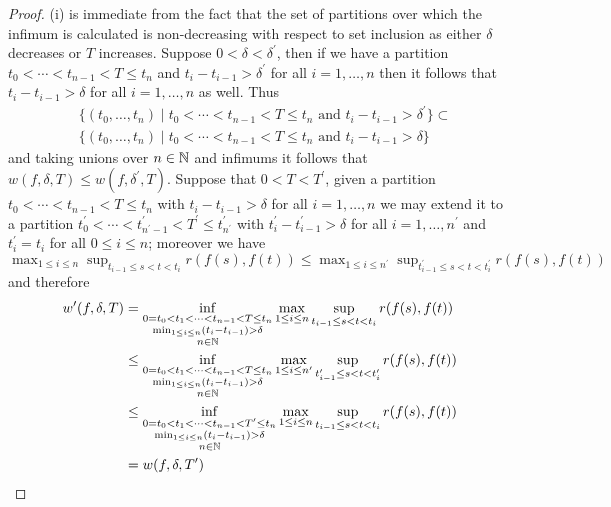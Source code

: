 \begin{proof}
(i) is immediate from the fact that the set of partitions over which the infimum is calculated is non-decreasing with respect to set inclusion as either $\delta$ decreases or $T$ increases.  Suppose $0 < \delta < \delta^\prime$, then if we have a partition $t_0 < \dotsb < t_{n-1} < T \leq t_n$ and $t_i - t_{i-1} > \delta^\prime$ for all $i=1, \dotsc, n$ then it follows that $t_i - t_{i-1} > \delta$ for all $i=1, \dotsc, n$ as well.  Thus 
\begin{align*}
&\lbrace (t_0, \dotsc, t_n) \mid t_0 < \dotsb < t_{n-1} < T \leq t_n \text{ and } t_i - t_{i-1} > \delta^\prime \rbrace \subset  \\
&\lbrace (t_0, \dotsc, t_n) \mid t_0 < \dotsb < t_{n-1} < T \leq t_n \text{ and } t_i - t_{i-1} > \delta \rbrace 
\end{align*}
and taking unions over $n \in \mathbb{N}$ and infimums it follows that $w(f,\delta, T) \leq w(f,\delta^\prime, T)$.  Suppose that $0 < T < T^\prime$, given a partition $t_0 < \dotsb < t_{n-1} < T \leq t_n$ with $t_i - t_{i-1} > \delta$ for all $i=1, \dotsc, n$ we may extend it to a partition $t^\prime_0 < \dotsb < t^\prime_{n^\prime-1} < T^\prime \leq t^\prime_{n^\prime}$ with $t^\prime_i - t^\prime_{i-1} > \delta$ for all $i=1, \dotsc, n^\prime$ and $t^\prime_i = t_i$ for all $0 \leq i \leq n$; moreover we have $\max_{1 \leq i \leq n} \sup_{t_{i-1} \leq s < t < t_i} r(f(s),f(t)) \leq \max_{1 \leq i \leq n^\prime} \sup_{t^\prime_{i-1} \leq s < t < t^\prime_i} r(f(s),f(t))$ and therefore
\begin{align*}
w^\prime(f,\delta, T) &= \inf_{\substack{0=t_0 < t_1 < \dotsb < t_{n-1} <  T \leq t_n \\
  \min_{1 \leq i \leq n} (t_i - t_{i-1}) > \delta \\ n \in \mathbb{N}}}
\max_{1 \leq i \leq n} \sup_{t_{i-1} \leq s < t < t_i} r(f(s), f(t)) \\
&\leq \inf_{\substack{0=t_0 < t_1 < \dotsb < t_{n-1} <  T \leq t_n \\
  \min_{1 \leq i \leq n} (t_i - t_{i-1}) > \delta \\ n \in \mathbb{N}}}
\max_{1 \leq i \leq n^\prime} \sup_{t^\prime_{i-1} \leq s < t < t^\prime_i} r(f(s), f(t)) \\
&\leq \inf_{\substack{0=t_0 < t_1 < \dotsb < t_{n-1} <  T^\prime \leq t_n \\
  \min_{1 \leq i \leq n} (t_i - t_{i-1}) > \delta \\ n \in \mathbb{N}}}
\max_{1 \leq i \leq n} \sup_{t_{i-1} \leq s < t < t_i} r(f(s), f(t)) \\
&= w(f, \delta, T^\prime)\\
\end{align*}


\end{proof}
